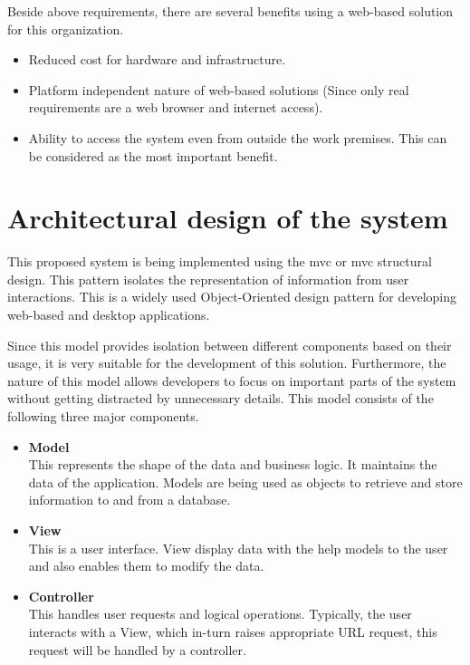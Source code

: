 \documentclass[12pt]{report}
\begin{document}
Beside above requirements, there are several benefits using a web-based solution for this organization.

\begin{itemize}
	\item Reduced cost for hardware and infrastructure.

	\item Platform independent nature of web-based solutions (Since only real requirements are a web browser and internet access).

	\item Ability to access the system even from outside the work premises. This can be considered as the most important benefit.
\end{itemize}

\section{Architectural design of the system}
This proposed system is being implemented using the \acrshort{mvc} or \acrlong{mvc} structural design. This pattern isolates the representation of information from user interactions. This is a widely used Object-Oriented design pattern for developing web-based and desktop applications.

Since this model provides isolation between different components based on their usage, it is very suitable for the development of this solution. Furthermore, the nature of this model allows developers to focus on important parts of the system without getting distracted by unnecessary details. This model consists of the following three major components.

\begin{itemize}
	\item {\bf{Model}}\\
	      This represents the shape of the data and business logic. It maintains the data of the application. Models are being used as objects to retrieve and store information to and from a database.

	\item {\bf{View}}\\
	      This is a user interface. View display data with the help models to the user and also enables them to modify the data.

	\item {\bf{Controller}}\\
	      This handles user requests and logical operations. Typically, the user interacts with a View, which in-turn raises appropriate URL request, this request will be handled by a controller.
\end{itemize}
\end{document}

